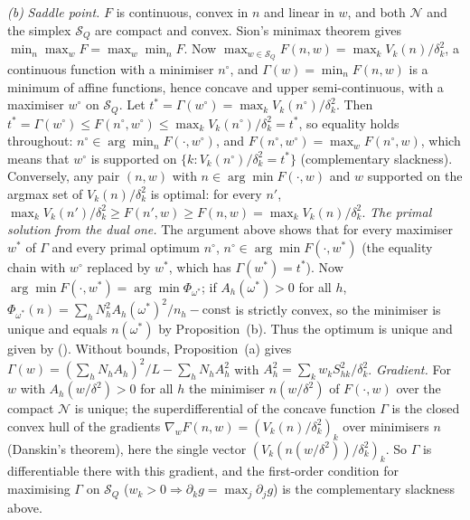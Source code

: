\emph{(b)} \emph{Saddle point.} $F$ is continuous, convex in $n$ and linear in $w$, and both $\mathcal N$ and the simplex $\mathcal S_Q$ are compact and convex. Sion's minimax theorem \citep{sion1958} gives $\min_n\max_wF=\max_w\min_nF$. Now $\max_{w\in\mathcal S_Q}F(n,w)=\max_kV_k(n)/\delta_k^2$, a continuous function with a minimiser $n^\circ$, and $\Gamma(w)=\min_nF(n,w)$ is a minimum of affine functions, hence concave and upper semi-continuous, with a maximiser $w^\circ$ on $\mathcal S_Q$. Let $t^\ast=\Gamma(w^\circ)=\max_kV_k(n^\circ)/\delta_k^2$. Then $t^\ast=\Gamma(w^\circ)\le F(n^\circ,w^\circ)\le\max_kV_k(n^\circ)/\delta_k^2=t^\ast$, so equality holds throughout: $n^\circ\in\arg\min_nF(\cdot,w^\circ)$, and $F(n^\circ,w^\circ)=\max_wF(n^\circ,w)$, which means that $w^\circ$ is supported on $\{k:V_k(n^\circ)/\delta_k^2=t^\ast\}$ (complementary slackness). Conversely, any pair $(n,w)$ with $n\in\arg\min F(\cdot,w)$ and $w$ supported on the argmax set of $V_k(n)/\delta_k^2$ is optimal: for every $n'$, $\max_kV_k(n')/\delta_k^2\ge F(n',w)\ge F(n,w)=\max_kV_k(n)/\delta_k^2$.
\emph{The primal solution from the dual one.} The argument above shows that for every maximiser $w^\ast$ of $\Gamma$ and every primal optimum $n^\circ$, $n^\circ\in\arg\min F(\cdot,w^\ast)$ (the equality chain with $w^\circ$ replaced by $w^\ast$, which has $\Gamma(w^\ast)=t^\ast$). Now $\arg\min F(\cdot,w^\ast)=\arg\min\Phi_{\omega^\ast}$; if $A_h(\omega^\ast)>0$ for all $h$, $\Phi_{\omega^\ast}(n)=\sum_hN_h^2A_h(\omega^\ast)^2/n_h-\text{const}$ is strictly convex, so the minimiser is unique and equals $n(\omega^\ast)$ by Proposition~(b). Thus the optimum is unique and given by (). Without bounds, Proposition~(a) gives $\Gamma(w)=(\sum_hN_hA_h)^2/L-\sum_hN_hA_h^2$ with $A_h^2=\sum_kw_kS^2_{hk}/\delta_k^2$.
\emph{Gradient.} For $w$ with $A_h(w/\delta^2)>0$ for all $h$ the minimiser $n(w/\delta^2)$ of $F(\cdot,w)$ over the compact $\mathcal N$ is unique; the superdifferential of the concave function $\Gamma$ is the closed convex hull of the gradients $\nabla_wF(n,w)=(V_k(n)/\delta_k^2)_k$ over minimisers $n$ (Danskin's theorem), here the single vector $(V_k(n(w/\delta^2))/\delta_k^2)_k$. So $\Gamma$ is differentiable there with this gradient, and the first-order condition for maximising $\Gamma$ on $\mathcal S_Q$ ($w_k>0\Rightarrow\partial_kg=\max_j\partial_jg$) is the complementary slackness above.

